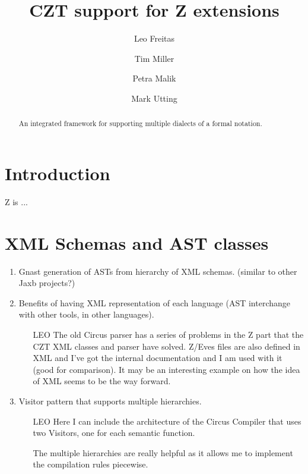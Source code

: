 \documentclass{llncs}
\begin{document}
\title{CZT support for Z extensions}
\author{Leo Freitas \and Tim Miller \and Petra Malik \and Mark Utting}
\maketitle

\begin{abstract}
  An integrated framework for supporting multiple dialects of a formal
  notation.
\end{abstract}

\section{Introduction} \label{sec:intro}

  Z\cite{isoz} is ...

\section{XML Schemas and AST classes}

  \begin{enumerate}
    \item Gnast generation of ASTs from hierarchy of XML schemas.
      (similar to other Jaxb projects?)

    \item Benefits of having XML representation of each language
      (AST interchange with other tools, in other languages).

      \begin{itemize}
        \item[LEO]
        The old Circus parser has a series of problems in the Z part that the CZT XML classes and parser have solved.
        Z/Eves files are also defined in XML and I've got the internal documentation and I am used with it (good for comparison).
        It may be an interesting example on how the idea of XML seems to be the way forward.
      \end{itemize}

    \item Visitor pattern that supports multiple hierarchies.
      \begin{itemize}
        \item[LEO] Here I can include the architecture of the Circus Compiler that uses
                   two Visitors, one for each semantic function.

                   The multiple hierarchies are really helpful as it allows me to implement
                   the compilation rules piecewise.
      \end{itemize}
  \end{enumerate}
\end{document}
